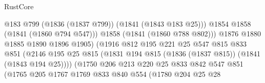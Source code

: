 \begin{lexlean}{RustCore}
\begin{coremodule}
                                              @183
                                              @799
                                              (@1836 (@1837 @799))
                                              (@1841 (@1843 @183 @25)))
                                            @1854
                                            @1858
                                            (@1841 (@1860 @794 @547)))
                                          @1858
                                          (@1841 (@1860 @788 @802)))
                                        @1876
                                        @1880
                                        @1885
                                        @1890
                                        @1896
                                        @1905)
                                      (@1916
                                        @812
                                        @195
                                        @221
                                        @25
                                        @547
                                        @815
                                        @833
                                        @851
                                        (@2146
                                          @195
                                          @25
                                          @815
                                          (@1831
                                            @194
                                            @815
                                            (@1836 (@1837 @815))
                                            (@1841 (@1843 @194 @25))))
                                        (@1750
                                          @206
                                          @213
                                          @220
                                          @25
                                          @833
                                          @842
                                          @547
                                          @851
                                          (@1765
                                            @205
                                            @1767
                                            @1769
                                            @833
                                            @840
                                            @554
                                            (@1780
                                              @204
                                              @25
                                              @28

\end{coremodule}
\end{lexlean}
